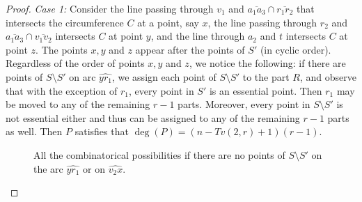 \documentclass[11pt,a4paper]{article}
\theoremstyle{plain}
\theoremstyle{definition}
\begin{document}
\begin{proof}


\noindent\emph{Case 1:}
Consider the line passing through $v_1$ and $\overline{a_1a_3} \cap \overline{r_1r_2}$ that intersects the circumference $C$ at
a point, say $x$, the line passing through $r_2$ and $\overline{a_1a_3}\cap \overline{v_1 v_2}$ intersects $C$ at point $y$, and the line through $a_2$ and $t$ intersects $C$ at point $z$.  The points $x,y$ and $z$ appear after the points of $S'$ (in cyclic order). Regardless of the order of points $x,y$ and $z$, we notice the following: if there are points of $S\setminus S'$ on arc $\widehat{yr_1}$, we assign each point of $S\setminus S'$ to the part $R$, and observe that with the exception of $r_1$, every point in $S'$ is an essential point. Then $r_1$ may be moved to any of the remaining $r-1$ parts. Moreover, every point in $S\setminus S'$ is not essential either and thus can be assigned to any of the remaining $r-1$ parts as well. Then $P$ satisfies that $\deg(P)=(n-Tv(2,r)+1)(r-1)$. \\



\begin{figure}[h!]
\centering
%

\caption{All the combinatorical possibilities if there are no points of $S\setminus S'$ on the arc $\widehat{yr_1}$ or on $\widehat{v_2x}$. }\label{conv cases}
\end{figure}


\end{proof}
\end{document}

